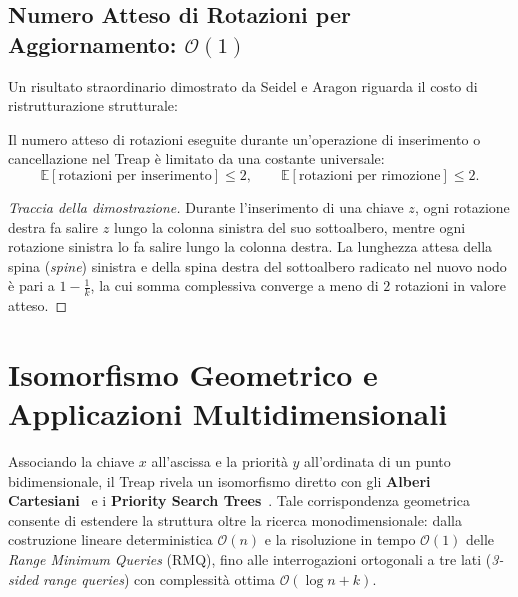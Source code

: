 \FloatBarrier
\subsection{Numero Atteso di Rotazioni per Aggiornamento: $\mathcal{O}(1)$}
Un risultato straordinario dimostrato da Seidel e Aragon riguarda il costo di ristrutturazione strutturale:

\begin{theorem}
Il numero atteso di rotazioni eseguite durante un'operazione di inserimento o cancellazione nel Treap \`e limitato da una costante universale:
\begin{equation}
  \mathbb{E}[\text{rotazioni per inserimento}] \le 2, \qquad \mathbb{E}[\text{rotazioni per rimozione}] \le 2.
\end{equation}
\end{theorem}

\begin{proof}[Traccia della dimostrazione]
Durante l'inserimento di una chiave $z$, ogni rotazione destra fa salire $z$ lungo la colonna sinistra del suo sottoalbero, mentre ogni rotazione sinistra lo fa salire lungo la colonna destra. La lunghezza attesa della spina (\textit{spine}) sinistra e della spina destra del sottoalbero radicato nel nuovo nodo \`e pari a $1 - \frac{1}{k}$, la cui somma complessiva converge a meno di $2$ rotazioni in valore atteso.
\end{proof}

\FloatBarrier
\section{Isomorfismo Geometrico e Applicazioni Multidimensionali}
\label{sec:geometric-applications}

Associando la chiave $x$ all'ascissa e la priorit\`a $y$ all'ordinata di un punto bidimensionale, il Treap rivela un isomorfismo diretto con gli \textbf{Alberi Cartesiani}~\cite{vuillemin1980} e i \textbf{Priority Search Trees}~\cite{mccreight1985}. Tale corrispondenza geometrica consente di estendere la struttura oltre la ricerca monodimensionale: dalla costruzione lineare deterministica $\mathcal{O}(n)$ e la risoluzione in tempo $\mathcal{O}(1)$ delle \textit{Range Minimum Queries} (RMQ), fino alle interrogazioni ortogonali a tre lati (\textit{3-sided range queries}) con complessit\`a ottima $\mathcal{O}(\log n + k)$.

\FloatBarrier
